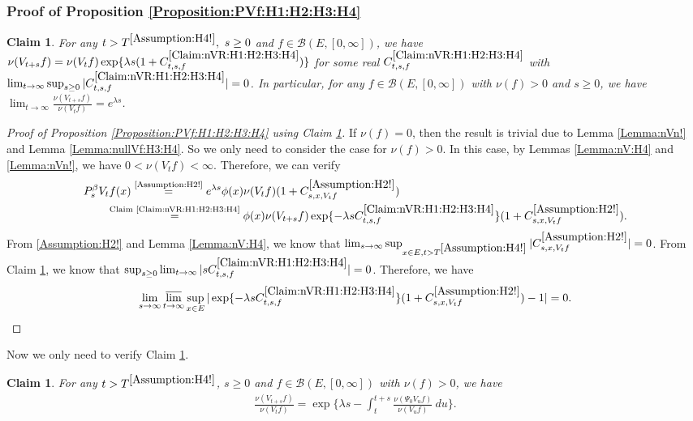 \documentclass[12pt,a4paper]{amsart}
\numberwithin{equation}{section}
\theoremstyle{plain}
\newtheorem{claim}[thm]{Claim}
\theoremstyle{definition}
\theoremstyle{remark}
\newcounter{N}
\newcounter{n}[N]
\begin{document}
\subsubsection{Proof of Proposition \ref{Proposition:PVf:H1:H2:H3:H4}}
\label{sec:PVf}
\begin{claim} \label{Claim:nVR:H1:H2:H3:H4} 
For any $t> T^{\ref{Assumption:H4!}},~s \geq 0$ and $f\in \mathcal B(E,[0,\infty])$, we have $\nu(V_{t+s}f) = \nu(V_tf) \exp\{\lambda s (1+C^{\ref{Claim:nVR:H1:H2:H3:H4}}_{t,s,f}) \}$ for some real $C^{\ref{Claim:nVR:H1:H2:H3:H4}}_{t,s,f}$ with $\lim_{t\to \infty} \sup_{s\geq  0} |C^{\ref{Claim:nVR:H1:H2:H3:H4}}_{t,s,f}| = 0$.
In particular, for any $f\in \mathcal B(E,[0,\infty])$ with $\nu(f)>0$ and $s\geq 0$, we have $\lim_{t\to \infty} \frac{\nu(V_{t+s}f)}{\nu(V_tf)} = e^{\lambda s}$.
\end{claim}
\begin{proof}[{Proof of Proposition \ref{Proposition:PVf:H1:H2:H3:H4} using Claim \ref{Claim:nVR:H1:H2:H3:H4}}]
If $\nu(f) = 0$, then the result is trivial due to Lemma \ref{Lemma:nVn!} and Lemma \ref{Lemma:nullVf:H3:H4}.
So we only need to consider the case for $\nu(f)>0$. 
In this case, by Lemmas \ref{Lemma:nV:H4} and \ref{Lemma:nVn!}, we have $0<\nu(V_{t}f)<\infty$.
Therefore, we can verify
\begin{align}
\MoveEqLeft P_s^\beta V_t f(x) 
\overset{\text{\ref{Assumption:H2!}}}= e^{\lambda s} \phi(x) \nu(V_tf) (1+C^{\ref{Assumption:H2!}}_{s,x,V_tf})
\\&\overset{\text{Claim \ref{Claim:nVR:H1:H2:H3:H4}}}= \phi(x) \nu(V_{t+s}f) \exp\{-\lambda s C^{\ref{Claim:nVR:H1:H2:H3:H4}}_{t,s,f}\} (1+C^{\ref{Assumption:H2!}}_{s,x,V_tf}).
\end{align}
From \ref{Assumption:H2!} and Lemma \ref{Lemma:nV:H4}, we know that $\lim_{s\to \infty} \sup_{x\in E, t> T^{\ref{Assumption:H4!}}} |C^{\ref{Assumption:H2!}}_{s,x,V_tf}| = 0$.
From Claim \ref{Claim:nVR:H1:H2:H3:H4}, we know that $\sup_{s\geq 0} \lim_{t\to \infty} |sC^{\ref{Claim:nVR:H1:H2:H3:H4}}_{t,s,f}| = 0$.
Therefore, we have \[\lim_{s\to \infty}\varlimsup_{t\to \infty}\sup_{x\in E}|\exp\{-\lambda s C^{\ref{Claim:nVR:H1:H2:H3:H4}}_{t,s,f}\} (1+C^{\ref{Assumption:H2!}}_{s,x,V_tf})-1| = 0. \qedhere\] 
\end{proof}
Now we only need to verify Claim \ref{Claim:nVR:H1:H2:H3:H4}.
\begin{claim} \label{Claim:nVI:H4} 
For any $t>T^{\ref{Assumption:H4!}}$, $s\geq 0$ and $f \in \mathcal B(E,[0,\infty])$ with $\nu(f)>0$, we have
\begin{align}
  \frac{\nu(V_{t+s} f)} {\nu(V_t f)} 
  = \exp\Big\{ \lambda s - \int_t^{t+s} \frac{\nu(\Psi_0 V_u f) }{\nu(V_u f)} ~du\Big\}.
  \end{align}
\end{claim} 
\end{document}
